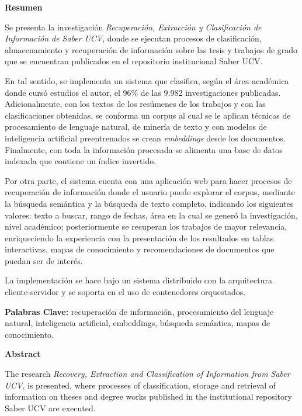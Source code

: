 \documentclass[
  12pt,
  openany]{book}
\begin{document}
\newpage
\thispagestyle{empty}
\large{\textbf{Resumen}}

Se presenta la investigación \emph{Recuperación, Extracción y Clasificación de Información de Saber UCV}, donde se ejecutan procesos de clasificación, almacenamiento y recuperación de información sobre las tesis y trabajos de grado que se encuentran publicados en el repositorio institucional Saber UCV.

En tal sentido, se implementa un sistema que clasifica, según el área académica donde cursó estudios el autor, el 96\% de las {9.982} investigaciones publicadas. Adicionalmente, con los textos de los resúmenes de los trabajos y con las clasificaciones obtenidas, se conforma un corpus al cual se le aplican técnicas de procesamiento de lenguaje natural, de minería de texto y con modelos de inteligencia artificial preentrenados se crean \textit{embeddings} desde los documentos. Finalmente, con toda la información procesada se alimenta una base de datos indexada que contiene un índice invertido.


Por otra parte, el sistema cuenta con una aplicación web para hacer procesos de recuperación de información donde el usuario puede explorar el corpus, mediante la búsqueda semántica y la búsqueda de texto completo, indicando los siguientes valores: texto a buscar, rango de fechas, área en la cual se generó la investigación, nivel académico; posteriormente se recuperan los trabajos de mayor relevancia, enriqueciendo la experiencia con la presentación de los resultados en tablas interactivas, mapas de conocimiento y recomendaciones de documentos que puedan ser de interés.

La implementación se hace bajo un sistema distribuido con la arquitectura cliente-servidor y se soporta en el uso de contenedores orquestados.

\vspace*{2cm}

\textbf{Palabras Clave:} recuperación de información, procesamiento del lenguaje natural, inteligencia artificial, embeddings, búsqueda semántica, mapas de conocimiento.




\newpage
\thispagestyle{empty}
\large{\textbf{Abstract}}

The research \emph{Recovery, Extraction and Classification of Information from Saber UCV}, is presented, where processes of classification, storage and retrieval of information on theses and degree works published in the institutional repository Saber UCV are executed.
\end{document}
